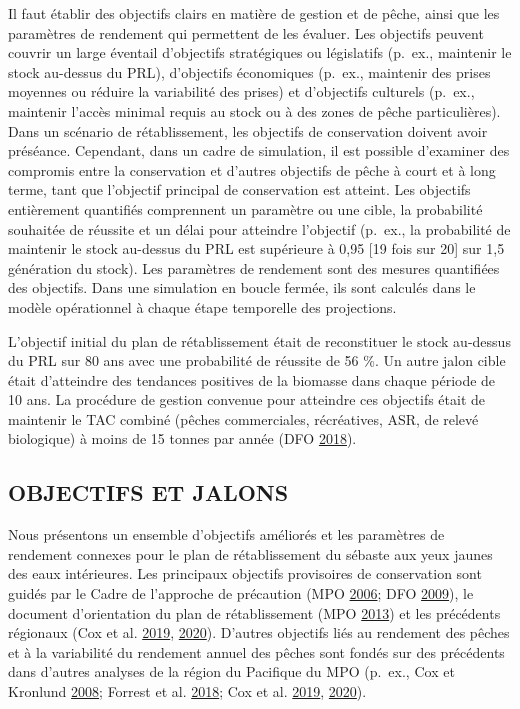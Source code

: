 \documentclass[french,11pt]{book}
\begin{document}
Il faut établir des objectifs clairs en matière de gestion et de pêche, ainsi que les paramètres de rendement qui permettent de les évaluer. Les objectifs peuvent couvrir un large éventail d'objectifs stratégiques ou législatifs (p.~ex., maintenir le stock au-dessus du PRL), d'objectifs économiques (p.~ex., maintenir des prises moyennes ou réduire la variabilité des prises) et d'objectifs culturels (p.~ex., maintenir l'accès minimal requis au stock ou à des zones de pêche particulières). Dans un scénario de rétablissement, les objectifs de conservation doivent avoir préséance. Cependant, dans un cadre de simulation, il est possible d'examiner des compromis entre la conservation et d'autres objectifs de pêche à court et à long terme, tant que l'objectif principal de conservation est atteint. Les objectifs entièrement quantifiés comprennent un paramètre ou une cible, la probabilité souhaitée de réussite et un délai pour atteindre l'objectif (p.~ex., la probabilité de maintenir le stock au-dessus du PRL est supérieure à 0,95 {[}19 fois sur 20{]} sur 1,5 génération du stock). Les paramètres de rendement sont des mesures quantifiées des objectifs. Dans une simulation en boucle fermée, ils sont calculés dans le modèle opérationnel à chaque étape temporelle des projections.

L'objectif initial du plan de rétablissement était de reconstituer le stock au-dessus du PRL sur 80 ans avec une probabilité de réussite de 56 \%. Un autre jalon cible était d'atteindre des tendances positives de la biomasse dans chaque période de 10 ans. La procédure de gestion convenue pour atteindre ces objectifs était de maintenir le TAC combiné (pêches commerciales, récréatives, ASR, de relevé biologique) à moins de 15 tonnes par année (DFO \protect\hyperlink{ref-ifmp2018}{2018}).

\hypertarget{sec:objectives-metrics-obj}{%
\subsection{OBJECTIFS ET JALONS}\label{sec:objectives-metrics-obj}}

Nous présentons un ensemble d'objectifs améliorés et les paramètres de rendement connexes pour le plan de rétablissement du sébaste aux yeux jaunes des eaux intérieures. Les principaux objectifs provisoires de conservation sont guidés par le Cadre de l'approche de précaution (MPO \protect\hyperlink{ref-dfo2006}{2006}; DFO \protect\hyperlink{ref-dfo2009}{2009}), le document d'orientation du plan de rétablissement (MPO \protect\hyperlink{ref-dfo2013}{2013}) et les précédents régionaux (Cox et al. \protect\hyperlink{ref-cox2019}{2019}, \protect\hyperlink{ref-cox2020}{2020}). D'autres objectifs liés au rendement des pêches et à la variabilité du rendement annuel des pêches sont fondés sur des précédents dans d'autres analyses de la région du Pacifique du MPO (p.~ex., Cox et Kronlund \protect\hyperlink{ref-cox2008a}{2008}; Forrest et al. \protect\hyperlink{ref-forrest2018}{2018}; Cox et al. \protect\hyperlink{ref-cox2019}{2019}, \protect\hyperlink{ref-cox2020}{2020}).
\end{document}

